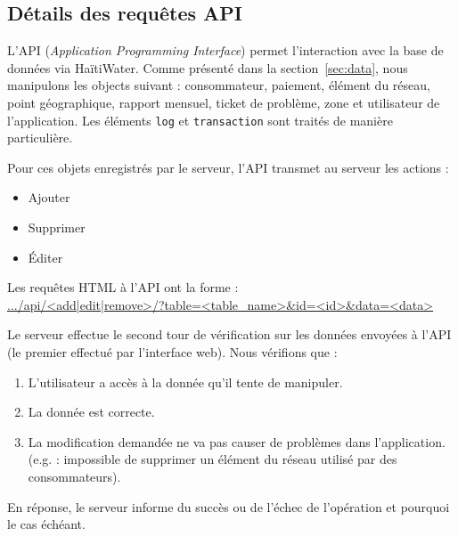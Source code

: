 \documentclass{EPL-master-thesis-covers-FR}
\begin{document}
			\subsection*{Détails des requêtes API}
				\label{sec:api}

				L'API (\emph{Application Programming Interface}) permet l'interaction avec la base de données via HaïtiWater. Comme présenté dans la section~\ref{sec:data}, nous manipulons les objects suivant : consommateur, paiement, élément du réseau, point géographique, rapport mensuel, ticket de problème, zone et utilisateur de l'application. Les éléments \texttt{log} et \texttt{transaction} sont traités de manière particulière.

				Pour ces objets enregistrés par le serveur, l'API transmet au serveur les actions :
				\begin{itemize}
					\item Ajouter
					\item Supprimer
					\item \'Editer
				\end{itemize}

				Les requêtes HTML à l'API ont la forme : \\
				\url{.../api/<add|edit|remove>/?table=<table_name>&id=<id>&data=<data>}

				Le serveur effectue le second tour de vérification sur les données envoyées à l'API (le premier effectué par l'interface web). Nous vérifions que :
				\begin{enumerate}
					\item L'utilisateur a accès à la donnée qu'il tente de manipuler.
					\item La donnée est correcte.
					\item La modification demandée ne va pas causer de problèmes dans l'application. (e.g. : impossible de supprimer un élément du réseau utilisé par des consommateurs).
				\end{enumerate}
				En réponse, le serveur informe du succès ou de l'échec de l'opération et pourquoi le cas échéant.

\end{document}
